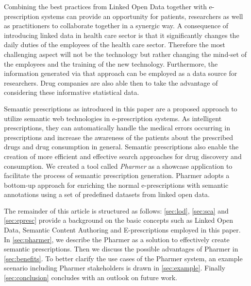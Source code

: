 \documentclass[conference]{IEEEtran}
\begin{document}
Combining the best practices from Linked Open Data together with e-prescription systems can provide an opportunity for patients, researchers as well as practitioners to collaborate together in a synergic way.
A consequence of introducing linked data in health care sector is that it significantly changes the daily duties of the employees of the health care sector.
Therefore the most challenging aspect will not be the technology but rather changing the mind-set of the employees and the training of the new technology\cite{challengesEP}.
Furthermore, the information generated via that approach can be employed as a data source for researchers.
Drug companies are also able then to take the advantage of considering these informative statistical data.

Semantic prescriptions as introduced in this paper are a proposed approach to utilize semantic web technologies in e-prescription systems.
As intelligent prescriptions, they can automatically handle the medical errors occurring in prescriptions and increase the awareness of the patients about the prescribed drugs and drug consumption in general.
Semantic prescriptions also enable the creation of more efficient and effective search approaches for drug discovery and consumption.
We created a tool called \emph{Pharmer} as a showcase application to facilitate the process of semantic prescription generation.
Pharmer adopts a bottom-up approach for enriching the normal e-prescriptions with semantic annotations using a set of predefined datasets from linked open data.

The remainder of this article is structured as follows:
\autoref{sec:lod}, \autoref{sec:sca} and \autoref{sec:epresc} provide a background on the basic concepts such as Linked Open Data, Semantic Content Authoring and E-prescriptions employed in this paper.
In \autoref{sec:pharmer}, we describe the Pharmer as a solution to effectively create semantic prescriptions.
Then we discuss the possible advantages of Pharmer in \autoref{sec:benefits}.
To better clarify the use cases of the Pharmer system, an example scenario including Pharmer stakeholders is drawn in \autoref{sec:example}.
Finally \autoref{sec:conclusion} concludes with an outlook on future work.
\end{document}
